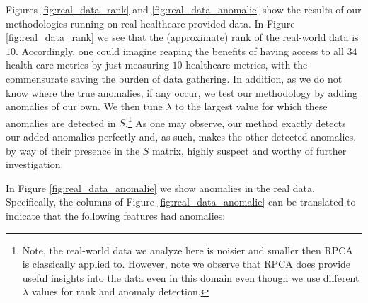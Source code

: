 \documentclass[conference]{IEEEtran}
\begin{document}



Figures \ref{fig:real_data_rank} and \ref{fig:real_data_anomalie} show the results of our methodologies running on real healthcare provided data.  In Figure \ref{fig:real_data_rank} we see that the (approximate) rank of the real-world data is $10$.   Accordingly, one could imagine reaping the benefits of having access to all $34$ health-care metrics by just measuring $10$ healthcare metrics, with the commensurate saving the burden of data gathering.  In addition, as we do not know where the true anomalies, if any occur, we test our methodology by adding anomalies of our own.  We then tune $\lambda$ to the largest value for which these anomalies are detected in $S$.\footnote{Note, the real-world data we analyze here is noisier and smaller then RPCA is classically applied to.  However, note we observe that RPCA does provide useful insights into the data even in this domain even though we use different $\lambda$ values for rank and anomaly detection.} As one may observe, our method exactly detects  our added anomalies perfectly and, as such, makes the other detected anomalies, by way of their presence in the $S$ matrix, highly suspect and worthy of further investigation.   

In Figure \ref {fig:real_data_anomalie}
we show anomalies in the real data.  Specifically, the columns of Figure \ref {fig:real_data_anomalie} can be translated to indicate that the following features had anomalies: 
\end{document}
